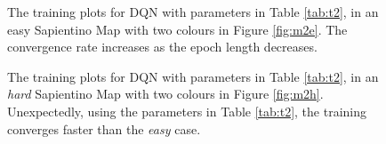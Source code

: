 \documentclass{article}
\begin{document}
\begin{figure}[h!]
  \centering
  \hfill
  \caption{The training plots for DQN with parameters in Table \ref{tab:t2}, in an easy Sapientino Map with two colours in Figure \ref{fig:m2e}. The convergence rate increases as the epoch length decreases. }\label{fig:p2e}
\end{figure}
\begin{figure}[h!]
  \centering
  \hfill
  \caption{The training plots for DQN with parameters in Table \ref{tab:t2}, in an \textit{hard} Sapientino Map with two colours in Figure \ref{fig:m2h}. Unexpectedly, using the parameters in Table \ref{tab:t2}, the training converges faster than the \textit{easy} case.
}
\end{figure}
\end{document}
